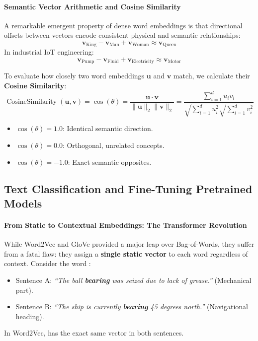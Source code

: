 \paragraph{Semantic Vector Arithmetic and Cosine Similarity}
A remarkable emergent property of dense word embeddings is that directional offsets between vectors encode consistent physical and semantic relationships:
\begin{equation}
\mathbf{v}_{\text{King}} - \mathbf{v}_{\text{Man}} + \mathbf{v}_{\text{Woman}} \approx \mathbf{v}_{\text{Queen}}\label{eq:word_analogy}
\end{equation}
In industrial IoT engineering:
\begin{equation*}
\mathbf{v}_{\text{Pump}} - \mathbf{v}_{\text{Fluid}} + \mathbf{v}_{\text{Electricity}} \approx \mathbf{v}_{\text{Motor}}
\end{equation*}

To evaluate how closely two word embeddings $\mathbf{u}$ and $\mathbf{v}$ match, we calculate their \textbf{Cosine Similarity}:
\begin{equation}
\operatorname{CosineSimilarity}(\mathbf{u}, \mathbf{v}) = \cos(\theta) = \frac{\mathbf{u} \cdot \mathbf{v}}{\|\mathbf{u}\|_2 \|\mathbf{v}\|_2} = \frac{\sum_{i=1}^d u_i v_i}{\sqrt{\sum_{i=1}^d u_i^2} \sqrt{\sum_{i=1}^d v_i^2}}\label{eq:cosine_similarity}
\end{equation}
\begin{itemize}
    \item $\cos(\theta) = 1.0$: Identical semantic direction.
    \item $\cos(\theta) = 0.0$: Orthogonal, unrelated concepts.
    \item $\cos(\theta) = -1.0$: Exact semantic opposites.
\end{itemize}

\subsection{Text Classification and Fine-Tuning Pretrained Models}\label{subsec:text_classification}

\paragraph{From Static to Contextual Embeddings: The Transformer Revolution}
While Word2Vec and GloVe provided a major leap over Bag-of-Words, they suffer from a fatal flaw: they assign a \textbf{single static vector} to each word regardless of context. 
Consider the word :
\begin{itemize}
    \item Sentence A: \emph{``The ball \textbf{bearing} was seized due to lack of grease.''} (Mechanical part).
    \item Sentence B: \emph{``The ship is currently \textbf{bearing} 45 degrees north.''} (Navigational heading).
\end{itemize}
In Word2Vec,  has the exact same vector in both sentences. 

